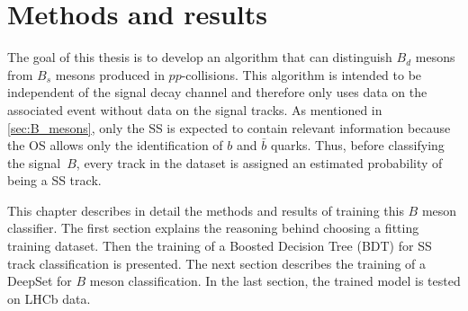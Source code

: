 \chapter{Methods and results} %


The goal of this thesis is to develop an algorithm that can distinguish $B_d$ mesons from $B_s$ mesons produced in $pp$-collisions.
This algorithm is intended to be independent of the signal decay channel and therefore only uses data on the associated event without data on the signal tracks.
As mentioned in \autoref{sec:B_mesons}, only the SS is expected to contain relevant information because the OS allows only the identification of $b$ and $\bar{b}$ quarks.
Thus, before classifying the signal~$B$, every track in the dataset is assigned an estimated probability of being a SS track.

This chapter describes in detail the methods and results of training this $B$ meson classifier.
The first section explains the reasoning behind choosing a fitting training dataset.
Then the training of a Boosted Decision Tree (BDT) for SS track classification is presented.
The next section describes the training of a DeepSet for $B$ meson classification.
In the last section, the trained model is tested on LHCb data.





